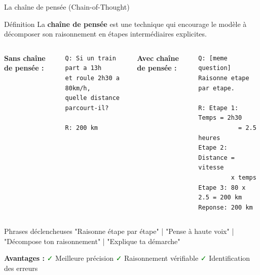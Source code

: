 \begin{frame}[fragile]{La chaîne de pensée (Chain-of-Thought)}
\begin{block}{Définition}
La \textbf{chaîne de pensée} est une technique qui encourage le modèle à décomposer son raisonnement en étapes intermédiaires explicites.
\end{block}

\vspace{0.3cm}

\begin{columns}
\textbf{Sans chaîne de pensée :}
\begin{lstlisting}[basicstyle=\ttfamily\scriptsize]
Q: Si un train part a 13h 
et roule 2h30 a 80km/h, 
quelle distance parcourt-il?

R: 200 km
\end{lstlisting}

\textbf{Avec chaîne de pensée :}
\begin{lstlisting}[basicstyle=\ttfamily\scriptsize]
Q: [meme question]
Raisonne etape par etape.

R: Etape 1: Temps = 2h30 
           = 2.5 heures
Etape 2: Distance = vitesse 
         x temps
Etape 3: 80 x 2.5 = 200 km
Reponse: 200 km
\end{lstlisting}
\end{columns}

\vspace{0.3cm}

\begin{exampleblock}{Phrases déclencheuses}
"Raisonne étape par étape" | "Pense à haute voix" | "Décompose ton raisonnement" | "Explique ta démarche"
\end{exampleblock}

\textbf{Avantages :} \textcolor{green}{\faCheck} Meilleure précision \quad \textcolor{green}{\faCheck} Raisonnement vérifiable \quad \textcolor{green}{\faCheck} Identification des erreurs
\end{frame}


